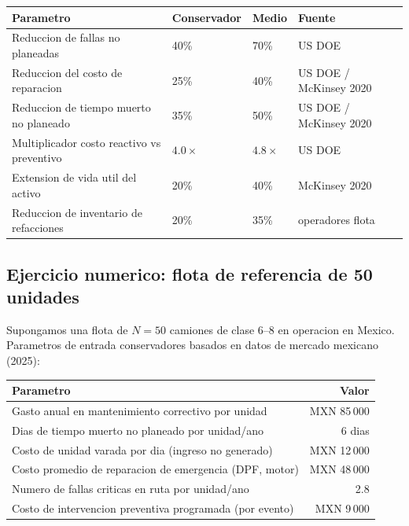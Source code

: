 \documentclass[10.5pt,a4paper]{article}
\begin{document}
\begin{center}
\small
\begin{tabular}{@{}p{6.2cm}lll@{}}
\toprule
\textbf{Parametro} & \textbf{Conservador} & \textbf{Medio} & \textbf{Fuente} \\
\midrule
Reduccion de fallas no planeadas & 40\% & 70\% & US DOE \\
Reduccion del costo de reparacion & 25\% & 40\% & US DOE / McKinsey 2020 \\
Reduccion de tiempo muerto no planeado & 35\% & 50\% & US DOE / McKinsey 2020 \\
Multiplicador costo reactivo vs preventivo & $4.0\times$ & $4.8\times$ & US DOE \\
Extension de vida util del activo & 20\% & 40\% & McKinsey 2020 \\
Reduccion de inventario de refacciones & 20\% & 35\% & operadores flota \\
\bottomrule
\end{tabular}
\end{center}

\subsection{Ejercicio numerico: flota de referencia de 50 unidades}

Supongamos una flota de $N=50$ camiones de clase 6--8 en operacion en Mexico.
Parametros de entrada conservadores basados en datos de mercado mexicano (2025):

\begin{center}
\small
\begin{tabular}{@{}p{7.0cm}r@{}}
\toprule
\textbf{Parametro} & \textbf{Valor} \\
\midrule
Gasto anual en mantenimiento correctivo por unidad & MXN 85\,000 \\
Dias de tiempo muerto no planeado por unidad/ano & 6 dias \\
Costo de unidad varada por dia (ingreso no generado) & MXN 12\,000 \\
Costo promedio de reparacion de emergencia (DPF, motor) & MXN 48\,000 \\
Numero de fallas criticas en ruta por unidad/ano & 2.8 \\
Costo de intervencion preventiva programada (por evento) & MXN 9\,000 \\
\bottomrule
\end{tabular}
\end{center}
\end{document}
